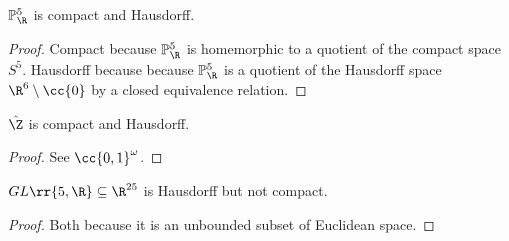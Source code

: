 \documentclass{article}
\begin{document}
\begin{claim*}
  $\mathbb P^5_\R$ is compact and Hausdorff.
  \begin{proof}
    Compact because $\mathbb P^5_\R$ is homemorphic to a quotient of the compact space $S^5$.
    Hausdorff because because $\mathbb P^5_\R$ is a quotient of the Hausdorff space $\R^6\setminus\cc{0}$
    by a closed equivalence relation.
  \end{proof}
\end{claim*}

\begin{claim*}
  $\hat\Z$ is compact and Hausdorff.
  \begin{proof}
    See $\cc{0,1}^\omega$.
  \end{proof}
\end{claim*}

\begin{claim*}
  $GL\rr{5,\R}\subseteq\R^{25}$ is Hausdorff but not compact.
  \begin{proof}
    Both because it is an unbounded subset of Euclidean space.
  \end{proof}
\end{claim*}
\end{document}
